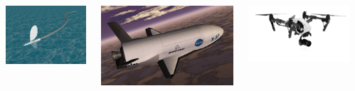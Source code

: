 \documentclass{beamer}
\begin{document}
\begin{frame}
\begin{columns}
\begin{column}{.25\textwidth}
    \end{column}
    \begin{column}{.25\textwidth}
      \includegraphics[width=\textwidth]{../Images/protei.jpg}
    \end{column}
    \begin{column}{.25\textwidth}
      \includegraphics[width=\textwidth]{../Images/X-37B.jpeg}
    \end{column}
    \begin{column}{.25\textwidth}
      \includegraphics[width=\textwidth]{../Images/flying_eye.png}
    \end{column}
  \end{columns}
\end{frame}
\end{document}
